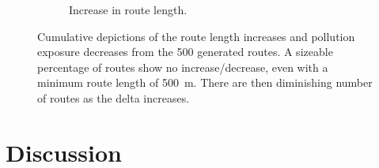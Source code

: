 \documentclass[11pt]{report}
\begin{document}
\begin{figure}[!tb]
\begin{minipage}{1\linewidth}
\begin{subfigure}[t]{.5\linewidth}
            	\caption{Increase in route length.}
            	\label{fig:length_increases}
	   \end{subfigure}
    \end{minipage}
    \caption[Changes in exposure and route length.]{Cumulative depictions of the route length increases and pollution exposure decreases from the 500 generated routes. A sizeable percentage of routes show no increase/decrease, even with a minimum route length of 500~m. There are then diminishing number of routes as the delta increases.}
    \label{fig:cumulatives}
\end{figure}

\section{Discussion}




%
%
\end{document}
